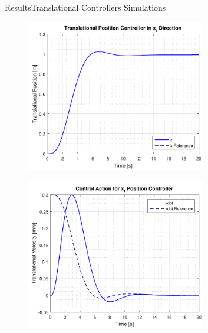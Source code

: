 \begin{frame}{Results}{Translational Controllers Simulations}
\begin{minipage}{\linewidth}
\begin{minipage}{0.49\linewidth}
\begin{figure}[H]
                \end{figure}                
          \end{minipage}
      \end{minipage}
    \begin{minipage}{\linewidth}
        \begin{minipage}{0.49\linewidth}
             \begin{figure}[H]
                 \centering
                 \includegraphics[width=0.7\textwidth]{figures/xStep}  
                \end{figure}
          \end{minipage}
          \hspace{0.03\linewidth}
          \begin{minipage}{0.49\linewidth}
             \begin{figure}[H]
                 \centering
                 \includegraphics[width=0.7\textwidth]{figures/xStepAction}  
                \end{figure}                
          \end{minipage}
      \end{minipage}  
\end{frame}

